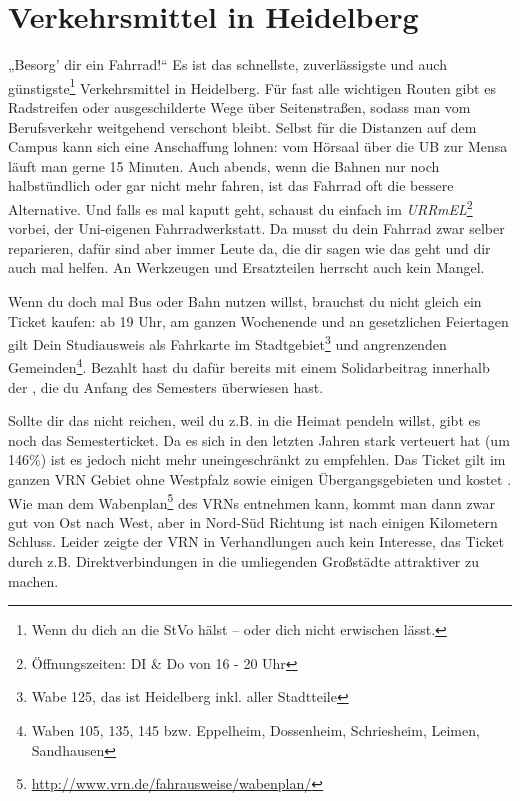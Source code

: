 \section{Verkehrsmittel in Heidelberg}
\label{verkehrsmittel}
„Besorg' dir ein Fahrrad!“ Es ist das schnellste, zuverlässigste und auch günstigste\footnote{Wenn du dich an die StVo hälst -- oder dich nicht erwischen lässt.} Verkehrsmittel in Heidelberg. Für fast alle wichtigen Routen gibt es Radstreifen oder ausgeschilderte Wege über Seitenstraßen, sodass man vom Berufsverkehr weitgehend verschont bleibt. Selbst für die Distanzen auf dem Campus kann sich eine Anschaffung lohnen: vom Hörsaal über die \gls{UB} zur Mensa läuft man gerne 15 Minuten. Auch abends, wenn die Bahnen nur noch halbstündlich oder gar nicht mehr fahren, ist das Fahrrad oft die bessere Alternative. Und falls es mal kaputt geht, schaust du einfach im \emph{URRmEL}\footnote{Öffnungszeiten: DI \& Do von 16 - 20 Uhr} vorbei, der Uni-eigenen Fahrradwerkstatt. Da musst du dein Fahrrad zwar selber reparieren, dafür sind aber immer Leute da, die dir sagen wie das geht und dir auch mal helfen. An Werkzeugen und Ersatzteilen herrscht auch kein Mangel.

Wenn du doch mal Bus oder Bahn nutzen willst, brauchst du nicht gleich ein Ticket kaufen: ab 19 Uhr, am ganzen Wochenende und an gesetzlichen Feiertagen gilt Dein Studiausweis als Fahrkarte im Stadtgebiet\footnote{Wabe 125, das ist Heidelberg inkl. aller Stadtteile} und angrenzenden Gemeinden\footnote{Waben 105, 135, 145 bzw. Eppelheim, Dossenheim, Schriesheim, Leimen, Sandhausen}. Bezahlt hast du dafür bereits mit einem Solidarbeitrag innerhalb der \EUR{\beitragssumme}, die du Anfang des Semesters überwiesen hast.

Sollte dir das nicht reichen, weil du z.B. in die Heimat pendeln willst, gibt es noch das Semesterticket. Da es sich in den letzten Jahren stark verteuert hat (um 146\%) ist es jedoch nicht mehr uneingeschränkt zu empfehlen. Das Ticket gilt im ganzen VRN Gebiet ohne Westpfalz sowie einigen Übergangsgebieten und kostet \EUR{\semesterticket}. Wie man dem Wabenplan\footnote{\url{http://www.vrn.de/fahrausweise/wabenplan/}} des \glspl{VRN} entnehmen kann, kommt man dann zwar gut von Ost nach West, aber in Nord-Süd Richtung ist nach einigen Kilometern Schluss. Leider zeigte der \gls{VRN} in Verhandlungen auch kein Interesse, das Ticket durch z.B. Direktverbindungen in die umliegenden Großstädte attraktiver zu machen.


